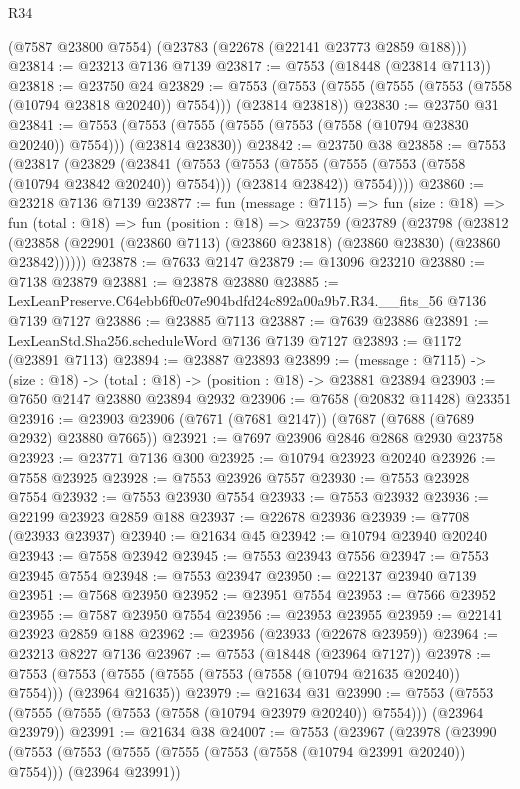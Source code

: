 \begin{lexlean}{R34}
\begin{coremodule}
    (@7587 @23800 @7554)
    (@23783 (@22678 (@22141 @23773 @2859 @188)))
@23814 := @23213 @7136 @7139
@23817 := @7553 (@18448 (@23814 @7113))
@23818 := @23750 @24
@23829 := @7553 (@7553 (@7555 (@7555 (@7553 (@7558 (@10794 @23818 @20240)) @7554))) (@23814 @23818))
@23830 := @23750 @31
@23841 := @7553 (@7553 (@7555 (@7555 (@7553 (@7558 (@10794 @23830 @20240)) @7554))) (@23814 @23830))
@23842 := @23750 @38
@23858 := @7553
    (@23817
      (@23829
        (@23841
          (@7553
            (@7553 (@7555 (@7555 (@7553 (@7558 (@10794 @23842 @20240)) @7554))) (@23814 @23842))
            @7554))))
@23860 := @23218 @7136 @7139
@23877 := fun (message : @7115) =>
  fun (size : @18) =>
  fun (total : @18) =>
  fun (position : @18) =>
  @23759
    (@23789
      (@23798
        (@23812 (@23858 (@22901 (@23860 @7113) (@23860 @23818) (@23860 @23830) (@23860 @23842))))))
@23878 := @7633 @2147
@23879 := @13096 @23210
@23880 := @7138 @23879
@23881 := @23878 @23880
@23885 := LexLeanPreserve.C64ebb6f0c07e904bdfd24c892a00a9b7.R34.__fits_56 @7136 @7139 @7127
@23886 := @23885 @7113
@23887 := @7639 @23886
@23891 := LexLeanStd.Sha256.scheduleWord @7136 @7139 @7127
@23893 := @1172 (@23891 @7113)
@23894 := @23887 @23893
@23899 := (message : @7115) -> (size : @18) -> (total : @18) -> (position : @18) -> @23881 @23894
@23903 := @7650 @2147 @23880 @23894 @2932
@23906 := @7658 (@20832 @11428) @23351
@23916 := @23903 @23906 (@7671 (@7681 @2147)) (@7687 (@7688 (@7689 @2932) @23880 @7665))
@23921 := @7697 @23906 @2846 @2868 @2930 @23758
@23923 := @23771 @7136 @300
@23925 := @10794 @23923 @20240
@23926 := @7558 @23925
@23928 := @7553 @23926 @7557
@23930 := @7553 @23928 @7554
@23932 := @7553 @23930 @7554
@23933 := @7553 @23932
@23936 := @22199 @23923 @2859 @188
@23937 := @22678 @23936
@23939 := @7708 (@23933 @23937)
@23940 := @21634 @45
@23942 := @10794 @23940 @20240
@23943 := @7558 @23942
@23945 := @7553 @23943 @7556
@23947 := @7553 @23945 @7554
@23948 := @7553 @23947
@23950 := @22137 @23940 @7139
@23951 := @7568 @23950
@23952 := @23951 @7554
@23953 := @7566 @23952
@23955 := @7587 @23950 @7554
@23956 := @23953 @23955
@23959 := @22141 @23923 @2859 @188
@23962 := @23956 (@23933 (@22678 @23959))
@23964 := @23213 @8227 @7136
@23967 := @7553 (@18448 (@23964 @7127))
@23978 := @7553 (@7553 (@7555 (@7555 (@7553 (@7558 (@10794 @21635 @20240)) @7554))) (@23964 @21635))
@23979 := @21634 @31
@23990 := @7553 (@7553 (@7555 (@7555 (@7553 (@7558 (@10794 @23979 @20240)) @7554))) (@23964 @23979))
@23991 := @21634 @38
@24007 := @7553
    (@23967
      (@23978
        (@23990
          (@7553
            (@7553 (@7555 (@7555 (@7553 (@7558 (@10794 @23991 @20240)) @7554))) (@23964 @23991))

\end{coremodule}
\end{lexlean}
